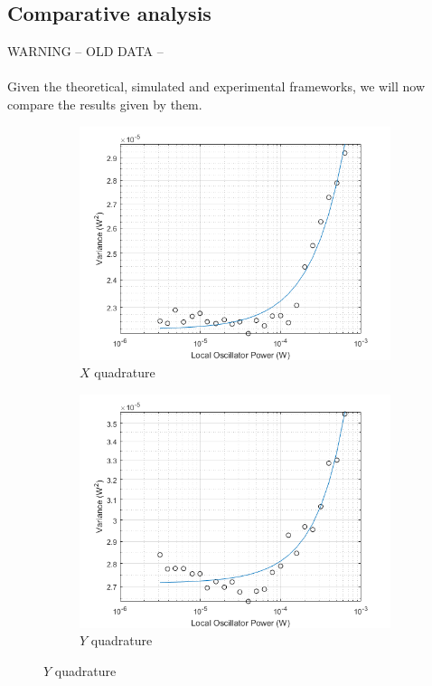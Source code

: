 \begin{bibunit}[plain]
\subsection{Comparative analysis}
%
WARNING -- OLD DATA --\\
\\
Given the theoretical, simulated and experimental frameworks, we will now compare the results given by them.
\\
%
\begin{figure}[H]
	\begin{subfigure}{.5\textwidth}
		\centering
		\includegraphics[width=.8\linewidth]{./sdf/optical_detection/figures/noise_exp_channel1.png}
		\caption{$X$ quadrature}
		\label{fig:noise-exp-1}
	\end{subfigure}%
	\begin{subfigure}{.5\textwidth}
		\centering
		\includegraphics[width=.8\linewidth]{./sdf/optical_detection/figures/noise_exp_channel3.png}
		\caption{$Y$ quadrature}
		\label{fig:noise-exp-3}
	\end{subfigure}

\end{figure}
\end{bibunit}
